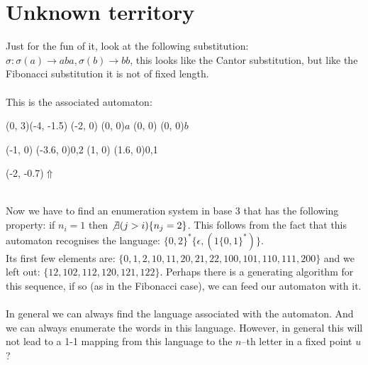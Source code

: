\documentclass{article}
\begin{document}
\section*{Unknown territory}
Just for the fun of it, look at the following substitution: 
$\sigma : \sigma(a) \rightarrow aba, \sigma(b) \rightarrow bb$, this looks 
like the Cantor substitution, but like the Fibonacci substitution it is not of
fixed length.\\
\\
This is the associated automaton:\\
\begin{graph}(0, 3)(-4, -1.5)
  (-2, 0) (0, 0){$a$}
  (0, 0)  (0, 0){$b$}

  (-1, 0) \freetext(-3.6, 0){0,2}
   
  (1, 0) \freetext(1.6, 0){0,1}

  \freetext(-2, -0.7){$\Uparrow$}
\end{graph}\\
Now we have to find an enumeration system in base 3 that has the following
property: if $n_i = 1$ then $\not\exists (j > i) \{ n_j = 2\}$. This follows
from the fact that this automaton recognises the language:
$\{0, 2\}^* \{\epsilon, (1\{0, 1\}^*)\}$. \\
Its first few elements are: 
$\{0, 1, 2, 10, 11, 20, 21, 22, 100, 101, 110, 111, 200\}$ and we left out:
$\{12, 102, 112, 120, 121, 122\}$. Perhaps there is a generating algorithm
for this sequence, if so (as in the Fibonacci case), we can feed our automaton 
with it.\\
\\
In general we can always find the language associated with the automaton. And
we can always enumerate the words in this language. However, in general this
will not lead to a 1-1 mapping from this language to the $n$--th letter in
a fixed point $u$?
\end{document}
